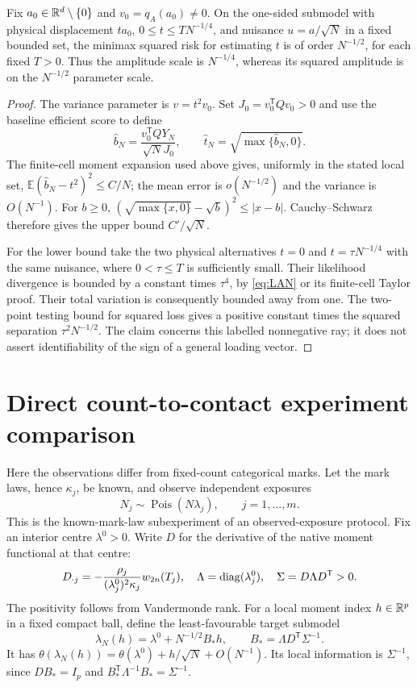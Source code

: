 \begin{corollary}\label{cor:root-rate}
Fix $a_0\in\mathbb R^d\setminus\{0\}$ and $v_0=q_A(a_0)\ne0$. On the one-sided submodel with physical displacement $t a_0$, $0\le t\le T N^{-1/4}$, and nuisance $u=a/\sqrt N$ in a fixed bounded set, the minimax squared risk for estimating $t$ is of order $N^{-1/2}$, for each fixed $T>0$. Thus the amplitude scale is $N^{-1/4}$, whereas its squared amplitude is on the $N^{-1/2}$ parameter scale.
\end{corollary}
\begin{proof}
The variance parameter is $v=t^2v_0$. Set $J_0=v_0^{\mathsf T}Qv_0>0$ and use the baseline efficient score to define
\[
 \widehat b_N=\frac{v_0^{\mathsf T}QY_N}{\sqrt N J_0},\qquad
 \widehat t_N=\sqrt{\max\{\widehat b_N,0\}}.
\]
The finite-cell moment expansion used above gives, uniformly in the stated local set,
$\mathbb E(\widehat b_N-t^2)^2\le C/N$; the mean error is $o(N^{-1/2})$ and the variance is $O(N^{-1})$. For $b\ge0$,
$(\sqrt{\max\{x,0\}}-\sqrt b)^2\le|x-b|$.
Cauchy--Schwarz therefore gives the upper bound $C'/\sqrt N$.

For the lower bound take the two physical alternatives $t=0$ and $t=\tau N^{-1/4}$ with the same nuisance, where $0<\tau\le T$ is sufficiently small. Their likelihood divergence is bounded by a constant times $\tau^4$, by \eqref{eq:LAN} or its finite-cell Taylor proof. Their total variation is consequently bounded away from one. The two-point testing bound for squared loss gives a positive constant times the squared separation $\tau^2N^{-1/2}$. The claim concerns this labelled nonnegative ray; it does not assert identifiability of the sign of a general loading vector.
\end{proof}

\section{Direct count-to-contact experiment comparison}\label{sec:score-contact}
Here the observations differ from fixed-count categorical marks. Let the mark laws, hence $\kappa_j$, be known, and observe independent exposures
\[
 N_j\sim\operatorname{Pois}(N\lambda_j),\qquad j=1,\ldots,m.
\]
This is the known-mark-law subexperiment of an observed-exposure protocol. Fix an interior centre $\lambda^0>0$. Write $D$ for the derivative of the native moment functional at that centre:
\[
 D_{\cdot j}=-\frac{\rho_j}{(\lambda_j^0)^2\kappa_j}w_{2n}(T_j),
 \quad \Lambda=\operatorname{diag}(\lambda_j^0),\quad
 \Sigma=D\Lambda D^{\mathsf T}>0.
\]
The positivity follows from Vandermonde rank. For a local moment index $h\in\mathbb R^p$ in a fixed compact ball, define the least-favourable target submodel
\begin{equation}\label{eq:least-favourable}
 \lambda_N(h)=\lambda^0+N^{-1/2}B_*h,
 \qquad B_*=\Lambda D^{\mathsf T}\Sigma^{-1}.
\end{equation}
It has $\theta(\lambda_N(h))=\theta(\lambda^0)+h/\sqrt N+O(N^{-1})$. Its local information is $\Sigma^{-1}$, since $DB_*=I_p$ and $B_*^{\mathsf T}\Lambda^{-1}B_*=\Sigma^{-1}$.

